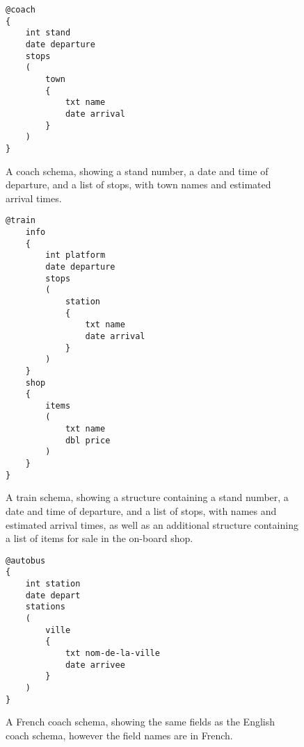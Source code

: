 \begin{figure}[tbh]
\begin{lstlisting}
@coach
{
    int stand
    date departure
    stops
    (
    	town
    	{
    		txt name
    		date arrival
    	}
    )
}
\end{lstlisting}
\caption[Example schema for a coach]{A coach schema, showing a stand number, a date and time of departure, and a list of stops, with town names and estimated arrival times.}
\label{fig:coach-schema}
\end{figure}

\begin{figure}[tbh]
\begin{lstlisting}
@train
	info
	{
		int platform
		date departure
		stops
		(
			station
			{
				txt name
				date arrival
			}
		)
	}
	shop
	{
		items
		(
			txt name
			dbl price
		)
	}
}
\end{lstlisting}
\caption[Example schema for a train]{A train schema, showing a structure containing a stand number, a date and time of departure, and a list of stops, with names and estimated arrival times, as well as an additional structure containing a list of items for sale in the on-board shop.}
\label{fig:train-schema}
\end{figure}


\begin{figure}[tbh]
\begin{lstlisting}
@autobus
{
    int station
    date depart
    stations
    (
    	ville
    	{
    		txt nom-de-la-ville
    		date arrivee
    	}
    )
}
\end{lstlisting}
\caption[Example schema for a French coach]{A French coach schema, showing the same fields as the English coach schema, however the field names are in French.}
\label{fig:french-coach-schema}
\end{figure}

